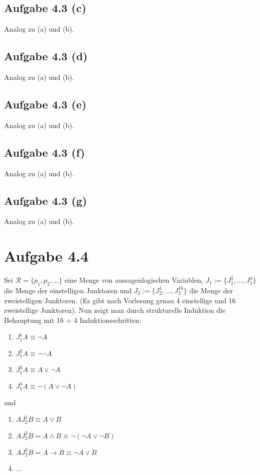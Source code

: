 \documentclass[12pt,a4paper]{article}
\begin{document}
\subsection*{Aufgabe 4.3 (c)}
Analog zu (a) und (b).

\subsection*{Aufgabe 4.3 (d)}
Analog zu (a) und (b).

\subsection*{Aufgabe 4.3 (e)}
Analog zu (a) und (b).

\subsection*{Aufgabe 4.3 (f)}
Analog zu (a) und (b).

\subsection*{Aufgabe 4.3 (g)}
Analog zu (a) und (b).

\section*{Aufgabe 4.4}
Sei $\mathcal{R}=\lbrace p_1,p_2,\ldots\rbrace$ eine Menge von aussagenlogischen Variablen, $J_1:=\lbrace J_1^1,\ldots,J_1^4\rbrace$ die Menge der einstelligen Junktoren und $J_2:=\lbrace J_2^1,\ldots,J_2^{16}\rbrace$ die Menge der zweistelligen Junktoren. (Es gibt nach Vorlesung genau 4 einstellige und 16 zweistellige Junktoren). Nun zeigt man durch strukturelle Induktion die Behauptung mit 16 + 4 Induktionsschritten:
\begin{enumerate}
\item $J_1^1 A\equiv\neg A$
\item $J_1^2 A\equiv\neg\neg A$
\item $J_1^3 A\equiv A\vee\neg A$
\item $J_1^4 A\equiv\neg(A\vee\neg A)$
\end{enumerate}
und
\begin{enumerate}
\item $A J_2^1 B\equiv A\vee B$
\item $A J_2^2 B=A\wedge B\equiv\neg(\neg A\vee\neg B)$
\item $A J_2^3 B=A\to B\equiv\neg A\vee B$
\item $\ldots$
\end{enumerate}
\end{document}
